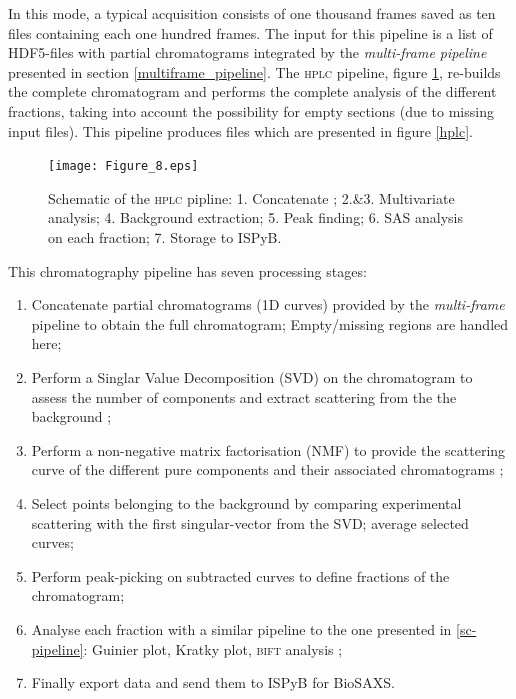 \documentclass[preprint]{iucr}              %
\begin{document}
In this mode, a typical acquisition consists of one thousand frames saved as ten files containing each one hundred frames.
The input for this pipeline is a list of HDF5-files with partial chromatograms integrated by the \textit{multi-frame pipeline} presented in section \ref{multiframe_pipeline}. 
The \textsc{hplc} pipeline, figure \ref{hplc_worflow}, re-builds the complete chromatogram and performs the complete analysis of the different fractions, taking into account the possibility for empty sections (due to missing input files).
This pipeline produces files which are presented in figure \ref{hplc}.
\begin{figure}
    \label{hplc_worflow}
    \texttt{[image: Figure\_8.eps]}
    \caption{Schematic of the \textsc{hplc} pipline: 
    1. Concatenate ;
    2.\&3. Multivariate analysis;
    4. Background extraction;
    5. Peak finding;
    6. SAS analysis on each fraction;
    7. Storage to ISPyB.}
\end{figure}

This chromatography pipeline has seven processing stages:
\begin{enumerate}
    \item Concatenate partial chromatograms (1D curves) provided by the \textit{multi-frame} pipeline to obtain the full chromatogram; Empty/missing regions are handled here;
    \item Perform a Singlar Value Decomposition (SVD) on the chromatogram to assess the number of components and extract scattering from the the background \cite{BioXTAS}; 
    \item Perform a non-negative matrix factorisation (NMF) to provide the scattering curve of the different pure components and their associated chromatograms \cite{NMF-SEC_SAXS}; 
    \item Select points belonging to the background by comparing experimental scattering with the first singular-vector from the SVD; average selected curves; %
    \item Perform peak-picking on subtracted curves to define fractions of the chromatogram; 
    \item Analyse each fraction with a similar pipeline to the one presented in \ref{sc-pipeline}: Guinier plot, Kratky plot, \textsc{bift} analysis ; %
    \item Finally export data and send them to ISPyB for BioSAXS.
\end{enumerate}
\end{document}
